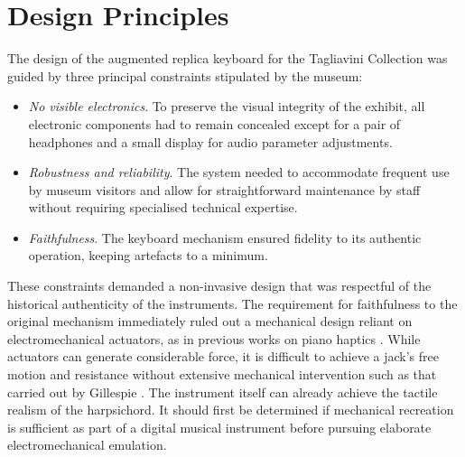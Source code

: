 \section{Design Principles}\label{design}

The design of the augmented replica keyboard for the Tagliavini Collection was guided by three principal constraints stipulated by the museum:
\begin{itemize}
\item \emph{No visible electronics}. To preserve the visual integrity of the exhibit, all electronic components had to remain concealed except for a pair of headphones and a small display for audio parameter adjustments.
\item \emph{Robustness and reliability}. The system needed to accommodate frequent use by museum visitors and allow for straightforward maintenance by staff without requiring specialised technical expertise.
\item \emph{Faithfulness}. The keyboard mechanism ensured fidelity to its authentic operation, keeping artefacts to a minimum. 
\end{itemize}

These constraints demanded a non-invasive design that was respectful of the historical authenticity of the instruments. The requirement for faithfulness to the original mechanism immediately ruled out a mechanical design reliant on electromechanical actuators, as in previous works on piano haptics \cite{Timmermans2020,Gillespie1996}. 
While actuators can generate considerable force, it is difficult to achieve a jack's free motion and resistance without extensive mechanical intervention such as that carried out by Gillespie \cite{Gillespie1996}. The instrument itself can already achieve the tactile realism of the harpsichord. 
It should first be determined if mechanical recreation is sufficient as part of a digital musical instrument before pursuing elaborate electromechanical emulation. 

